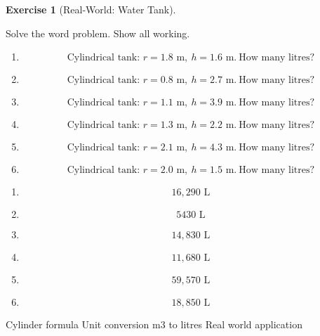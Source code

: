 \documentclass[
  letterpaper,
  DIV=11,
  numbers=noendperiod]{scrreprt}
\theoremstyle{definition}
\newtheorem{exercise}{Exercise}[chapter]
\theoremstyle{remark}
\begin{document}
\begin{exercise}[Real-World: Water
Tank]\protect\hypertarget{exr-comp-10}{}\label{exr-comp-10}

Solve the word problem. Show all working.

\begin{enumerate}
\def\labelenumi{\alph{enumi})}
\item
  \[\text{Cylindrical tank: }r=1.8\text{ m},\ h=1.6\text{ m.}\ \text{How many litres?}\]
\item
  \[\text{Cylindrical tank: }r=0.8\text{ m},\ h=2.7\text{ m.}\ \text{How many litres?}\]
\item
  \[\text{Cylindrical tank: }r=1.1\text{ m},\ h=3.9\text{ m.}\ \text{How many litres?}\]
\item
  \[\text{Cylindrical tank: }r=1.3\text{ m},\ h=2.2\text{ m.}\ \text{How many litres?}\]
\item
  \[\text{Cylindrical tank: }r=2.1\text{ m},\ h=4.3\text{ m.}\ \text{How many litres?}\]
\item
  \[\text{Cylindrical tank: }r=2.0\text{ m},\ h=1.5\text{ m.}\ \text{How many litres?}\]
\end{enumerate}

\begin{tcolorbox}[enhanced jigsaw, opacitybacktitle=0.6, coltitle=black, arc=.35mm, colframe=quarto-callout-tip-color-frame, colback=white, bottomrule=.15mm, left=2mm, colbacktitle=quarto-callout-tip-color!10!white, titlerule=0mm, opacityback=0, title=\textcolor{quarto-callout-tip-color}{\faLightbulb}\hspace{0.5em}{🔍 View Solution}, leftrule=.75mm, breakable, rightrule=.15mm, bottomtitle=1mm, toptitle=1mm, toprule=.15mm]

\begin{enumerate}
\def\labelenumi{\alph{enumi})}
\item
  \[16{,}290\text{ L}\]
\item
  \[5430\text{ L}\]
\item
  \[14{,}830\text{ L}\]
\item
  \[11{,}680\text{ L}\]
\item
  \[59{,}570\text{ L}\]
\item
  \[18{,}850\text{ L}\]
\end{enumerate}

\end{tcolorbox}

{Cylinder formula} {Unit conversion m3 to litres} {Real world
application}

\end{exercise}
\end{document}
